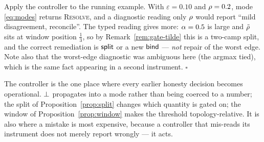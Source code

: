 \begin{workedbox}\Worked
Apply the controller to the running example. With $\varepsilon=0.10$ and
$\rho=0.2$, mode \eqref{eq:modes} returns \textsc{Resolve}, and a
diagnostic reading only $\rho$ would report ``mild disagreement,
reconcile''. The typed reading gives more: $\alpha=0.5$ is large and
$\tilde{\rho}$ sits at window position $\tfrac13$, so by
Remark~\ref{rem:gate-tilde} this is a two-camp split, and the correct
remediation is $\mathsf{split}$ or a new $\mathsf{bind}$ --- \emph{not} repair of the
worst edge. Note also that the worst-edge diagnostic was ambiguous here
(the argmax tied), which is the same fact appearing in a second
instrument.
\hfill$\square$
\end{workedbox}

\begin{hon}\Hon
The controller is the one place where every earlier honesty decision
becomes operational. $\bot$ propagates into a mode rather than being
coerced to a number; the split of Proposition~\ref{prop:split} changes
which quantity is gated on; the window of
Proposition~\ref{prop:window} makes the threshold topology-relative. It
is also where a mistake is most expensive, because a controller that
mis-reads its instrument does not merely report wrongly --- it acts.
\end{hon}
